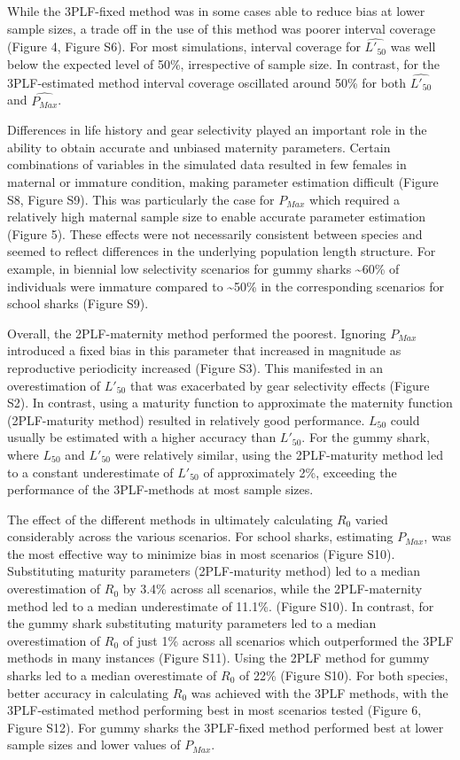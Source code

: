 \documentclass[
]{article}
\begin{document}
While the 3PLF-fixed method was in some cases able to reduce bias at lower sample sizes, a trade off in the use of this method was poorer interval coverage (Figure 4, Figure S6). For most simulations, interval coverage for \(\widehat{L'_{50}}\) was well below the expected level of 50\%, irrespective of sample size. In contrast, for the 3PLF-estimated method interval coverage oscillated around 50\% for both \(\widehat{L'_{50}}\) and \(\widehat{P_{Max}}\).

Differences in life history and gear selectivity played an important role in the ability to obtain accurate and unbiased maternity parameters. Certain combinations of variables in the simulated data resulted in few females in maternal or immature condition, making parameter estimation difficult (Figure S8, Figure S9). This was particularly the case for \(P_{Max}\) which required a relatively high maternal sample size to enable accurate parameter estimation (Figure 5). These effects were not necessarily consistent between species and seemed to reflect differences in the underlying population length structure. For example, in biennial low selectivity scenarios for gummy sharks \textasciitilde60\% of individuals were immature compared to \textasciitilde50\% in the corresponding scenarios for school sharks (Figure S9).

Overall, the 2PLF-maternity method performed the poorest. Ignoring \(P_{Max}\) introduced a fixed bias in this parameter that increased in magnitude as reproductive periodicity increased (Figure S3). This manifested in an overestimation of \(L'_{50}\) that was exacerbated by gear selectivity effects (Figure S2). In contrast, using a maturity function to approximate the maternity function (2PLF-maturity method) resulted in relatively good performance. \(L_{50}\) could usually be estimated with a higher accuracy than \(L'_{50}\). For the gummy shark, where \(L_{50}\) and \(L'_{50}\) were relatively similar, using the 2PLF-maturity method led to a constant underestimate of \(L'_{50}\) of approximately 2\%, exceeding the performance of the 3PLF-methods at most sample sizes.

The effect of the different methods in ultimately calculating \(R_0\) varied considerably across the various scenarios. For school sharks, estimating \(P_{Max}\), was the most effective way to minimize bias in most scenarios (Figure S10). Substituting maturity parameters (2PLF-maturity method) led to a median overestimation of \(R_0\) by 3.4\% across all scenarios, while the 2PLF-maternity method led to a median underestimate of 11.1\%. (Figure S10). In contrast, for the gummy shark substituting maturity parameters led to a median overestimation of \(R_0\) of just 1\% across all scenarios which outperformed the 3PLF methods in many instances (Figure S11). Using the 2PLF method for gummy sharks led to a median overestimate of \(R_0\) of 22\% (Figure S10). For both species, better accuracy in calculating \(R_0\) was achieved with the 3PLF methods, with the 3PLF-estimated method performing best in most scenarios tested (Figure 6, Figure S12). For gummy sharks the 3PLF-fixed method performed best at lower sample sizes and lower values of \(P_{Max}\).
\end{document}
